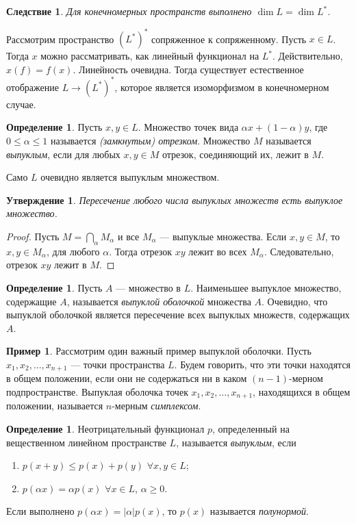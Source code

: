 \documentclass[12pt, titlepage, oneside]{amsbook}
\newtheorem{corollary}[theorem]{Следствие}
\newtheorem{claim}[theorem]{Утверждение}
\theoremstyle{definition}
\newtheorem{example}[theorem]{Пример}
\newtheorem{definition}[theorem]{Определение}
\theoremstyle{remark}
\begin{document}
\begin{corollary}
	\label{LP3}
	Для конечномерных пространств выполнено $\dim L=\dim L^*$.
\end{corollary}

Рассмотрим пространство $(L^*)^*$ сопряженное к сопряженному. Пусть $x\in L$. Тогда $x$ можно рассматривать, как линейный функционал на $L^*$. Действительно, $x(f)=f(x)$. Линейность очевидна. Тогда существует естественное отображение $L\rightarrow (L^*)^*$, которое является изоморфизмом в конечномерном случае.

\begin{definition}
	Пусть $x,y\in L$. Множество точек вида $\alpha x+(1-\alpha)y$, где $0\leq \alpha\leq 1$ называется \emph{(замкнутым) отрезком}. Множество $M$ называется \emph{выпуклым}, если для любых $x,y\in M$ отрезок, соединяющий их, лежит в $M$.
\end{definition}

Само $L$ очевидно является выпуклым множеством.

\begin{claim}
	\label{Vyp1}
	Пересечение любого числа выпуклых множеств есть выпуклое множество.
\end{claim}

\begin{proof}
	Пусть $M=\bigcap\limits_{\alpha} M_{\alpha}$ и все $M_{\alpha}$ --- выпуклые множества. Если $x,y\in M$, то $x,y\in M_{\alpha}$, для любого $\alpha$. Тогда отрезок $xy$ лежит во всех $M_{\alpha}$. Следовательно, отрезок $xy$ лежит в $M$.
\end{proof}

\begin{definition}
	Пусть $A$ --- множество в $L$. Наименьшее выпуклое множество, содержащие $A$, называется \emph{выпуклой оболочкой} множества $A$. Очевидно, что выпуклой оболочкой является пересечение всех выпуклых множеств, содержащих $A$.
\end{definition}

\begin{example}
	Рассмотрим один важный пример выпуклой оболочки. Пусть $x_1,x_2,\ldots,x_{n+1}$ --- точки пространства $L$. Будем говорить, что эти точки находятся в общем положении, если они не содержаться ни в каком $(n-1)$-мерном подпространстве. Выпуклая оболочка точек $x_1,x_2,\ldots,x_{n+1}$, находящихся в общем положении, называется $n$-мерным \emph{симплексом}.
\end{example}

\begin{definition}
	Неотрицательный функционал $p$, определенный на вещественном линейном пространстве $L$, называется \emph{выпуклым}, если
	\begin{enumerate}
		\item $p(x+y)\leq p(x)+p(y)$ $\forall x,y\in L$;
		\item $p(\alpha x)=\alpha p(x)$ $\forall x\in L$, $\alpha\geq 0$.
	\end{enumerate}
	Если выполнено $p(\alpha x)=|\alpha| p(x)$, то $p(x)$ называется \emph{полунормой}.
\end{definition}
\end{document}
